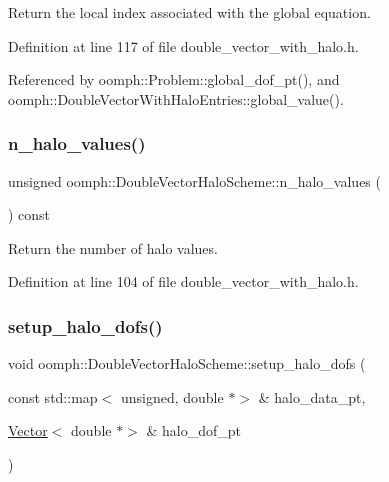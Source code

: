 Return the local index associated with the global equation. 



Definition at line 117 of file double\+\_\+vector\+\_\+with\+\_\+halo.\+h.



Referenced by oomph\+::\+Problem\+::global\+\_\+dof\+\_\+pt(), and oomph\+::\+Double\+Vector\+With\+Halo\+Entries\+::global\+\_\+value().

\mbox{\label{classoomph_1_1DoubleVectorHaloScheme_a490138b2ae077bc6630d13057217105b}} 
\subsubsection{\texorpdfstring{n\+\_\+halo\+\_\+values()}{n\_halo\_values()}}
{\footnotesize\ttfamily unsigned oomph\+::\+Double\+Vector\+Halo\+Scheme\+::n\+\_\+halo\+\_\+values (\begin{DoxyParamCaption}{ }\end{DoxyParamCaption}) const\hspace{0.3cm}{\ttfamily [inline]}}



Return the number of halo values. 



Definition at line 104 of file double\+\_\+vector\+\_\+with\+\_\+halo.\+h.

\mbox{\label{classoomph_1_1DoubleVectorHaloScheme_a7781f9e1b943655083ade4bf3b6b19a0}} 
\subsubsection{\texorpdfstring{setup\+\_\+halo\+\_\+dofs()}{setup\_halo\_dofs()}}
{\footnotesize\ttfamily void oomph\+::\+Double\+Vector\+Halo\+Scheme\+::setup\+\_\+halo\+\_\+dofs (\begin{DoxyParamCaption}\item[{const std\+::map$<$ unsigned, double $\ast$$>$ \&}]{halo\+\_\+data\+\_\+pt,  }\item[{\hyperlink{classoomph_1_1Vector}{Vector}$<$ double $\ast$$>$ \&}]{halo\+\_\+dof\+\_\+pt }\end{DoxyParamCaption})}



